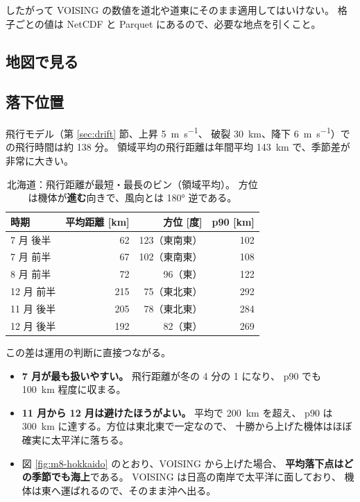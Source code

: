 したがって VOISING の数値を道北や道東にそのまま適用してはいけない。
格子ごとの値は NetCDF と Parquet にあるので、必要な地点を引くこと。

\subsection{地図で見る}



\subsection{落下位置}



飛行モデル（第 \ref{sec:drift} 節、上昇 \SI{5}{\metre\per\second}、
破裂 \SI{30}{\kilo\metre}、降下 \SI{6}{\metre\per\second}）での飛行時間は約 \num{138} 分。
領域平均の飛行距離は年間平均 \SI{143}{\kilo\metre} で、季節差が非常に大きい。

\begin{table}[H]
\centering
\caption{北海道：飛行距離が最短・最長のビン（領域平均）。
方位は機体が\textbf{進む}向きで、風向とは \ang{180} 逆である。}
\begin{tabular}{lrrr}
\toprule
時期 & 平均距離 [\si{\kilo\metre}] & 方位 [度] & p90 [\si{\kilo\metre}] \\
\midrule
7 月 後半 & 62 & 123（東南東） & 102 \\
7 月 前半 & 67 & 102（東南東） & 108 \\
8 月 前半 & 72 & 96（東） & 122 \\
\midrule
12 月 前半 & 215 & 75（東北東） & 292 \\
11 月 後半 & 205 & 78（東北東） & 284 \\
12 月 後半 & 192 & 82（東） & 269 \\
\bottomrule
\end{tabular}
\end{table}

この差は運用の判断に直接つながる。

\begin{itemize}
  \item \textbf{7 月が最も扱いやすい。} 飛行距離が冬の 4 分の 1 になり、
        p90 でも \SI{100}{\kilo\metre} 程度に収まる。
  \item \textbf{11 月から 12 月は避けたほうがよい。} 平均で \SI{200}{\kilo\metre} を超え、
        p90 は \SI{300}{\kilo\metre} に達する。方位は東北東で一定なので、
        十勝から上げた機体はほぼ確実に太平洋に落ちる。
  \item 図 \ref{fig:m8-hokkaido} のとおり、VOISING から上げた場合、
        \textbf{平均落下点はどの季節でも海上}である。
        VOISING は日高の南岸で太平洋に面しており、
        機体は東へ運ばれるので、そのまま沖へ出る。
\end{itemize}

